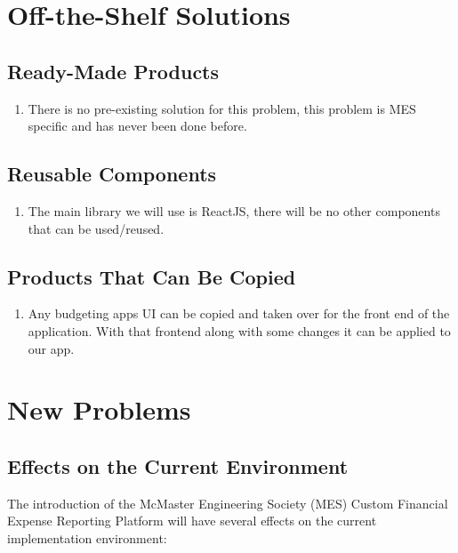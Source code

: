 \documentclass[12pt]{article}
\begin{document}
\section{Off-the-Shelf Solutions}
\subsection{Ready-Made Products}
\begin{enumerate}
  \item There is no pre-existing solution for this problem, this problem is MES specific and has never been done before.
\end{enumerate}
\subsection{Reusable Components}
\begin{enumerate}
  \item The main library we will use is ReactJS, there will be no other components that can be used/reused. 
\end{enumerate}
\subsection{Products That Can Be Copied}
\begin{enumerate}
  \item Any budgeting apps UI can be copied and taken over for the front end of the application. With that frontend along with some changes it can be applied to our app. 
\end{enumerate}

\section{New Problems}

\subsection{Effects on the Current Environment}
The introduction of the McMaster Engineering Society (MES) Custom Financial Expense Reporting Platform will have several effects on the current implementation environment:
\end{document}
